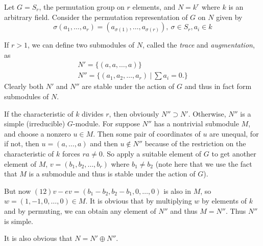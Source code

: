 \documentclass[12pt]{article}
\begin{document}
Let $G=S_r$, the permutation group on $r$ elements, and $N=k^r$ where $k$ is an arbitrary field. Consider the permutation representation of $G$ on $N$ given by
\[\sigma(a_1,\ldots,a_r)=(a_{\sigma(1)},\ldots,a_{\sigma(r)}),\ \sigma\in S_r, a_i\in k\]

If $r>1$, we can define two submodules of $N$, called the \emph{trace} and \emph{augmentation}, as
\begin{gather*}
N'=\{(a,a,\ldots,a)\}\\
N''=\{(a_1,a_2,\ldots,a_r)\ \bigl\rvert\ \sum a_i=0 \bigr .\}
\end{gather*}
Clearly both $N'$ and $N''$ are stable under the action of $G$ and thus in fact form submodules of $N$.

If the characteristic of $k$ divides $r$, then obviously $N''\supset N'$. Otherwise, $N''$ is a simple (irreducible) $G$-module. For suppose $N''$ has a nontrivial submodule $M$, and choose a nonzero $u\in M$. Then some pair of coordinates of $u$ are unequal, for if not, then $u=(a,\ldots,a)$ and then $u\not\in N''$ because of the restriction on the characteristic of $k$ forces $ra\neq 0$. So apply a suitable element of $G$ to get another element of $M$, $v=(b_1,b_2,\ldots,b_r)$ where $b_1\neq b_2$ (note here that we use the fact that $M$ is a submodule and thus is stable under the action of $G$).

But now $(1 2)v - ev = (b_1-b_2,b_2-b_1,0,\ldots,0)$ is also in $M$, so $w=(1,-1,0,\ldots,0)\in M$. It is obvious that by multiplying $w$ by elements of $k$ and by permuting, we can obtain any element of $N''$ and thus $M=N''$. Thus $N''$ is simple.

It is also obvious that $N=N'\oplus N''$.
\end{document}
